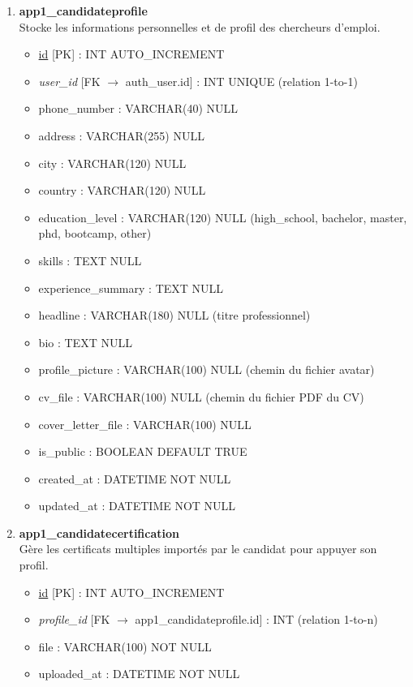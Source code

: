 \begin{enumerate}
    \item \textbf{app1\_candidateprofile} \\
    Stocke les informations personnelles et de profil des chercheurs d'emploi.
    \begin{itemize}
        \item \underline{id} [PK] : INT AUTO\_INCREMENT
        \item \textit{user\_id} [FK $\rightarrow$ auth\_user.id] : INT UNIQUE (relation 1-to-1)
        \item phone\_number : VARCHAR(40) NULL
        \item address : VARCHAR(255) NULL
        \item city : VARCHAR(120) NULL
        \item country : VARCHAR(120) NULL
        \item education\_level : VARCHAR(120) NULL (high\_school, \allowbreak bachelor, \allowbreak master, \allowbreak phd, \allowbreak bootcamp, \allowbreak other)
        \item skills : TEXT NULL
        \item experience\_summary : TEXT NULL
        \item headline : VARCHAR(180) NULL (titre professionnel)
        \item bio : TEXT NULL
        \item profile\_picture : VARCHAR(100) NULL (chemin du fichier avatar)
        \item cv\_file : VARCHAR(100) NULL (chemin du fichier PDF du CV)
        \item cover\_letter\_file : VARCHAR(100) NULL
        \item is\_public : BOOLEAN DEFAULT TRUE
        \item created\_at : DATETIME NOT NULL
        \item updated\_at : DATETIME NOT NULL
    \end{itemize}

    \item \textbf{app1\_candidatecertification} \\
    Gère les certificats multiples importés par le candidat pour appuyer son profil.
    \begin{itemize}
        \item \underline{id} [PK] : INT AUTO\_INCREMENT
        \item \textit{profile\_id} [FK $\rightarrow$ app1\_candidateprofile.id] : INT (relation 1-to-n)
        \item file : VARCHAR(100) NOT NULL
        \item uploaded\_at : DATETIME NOT NULL
    \end{itemize}


\end{enumerate}
